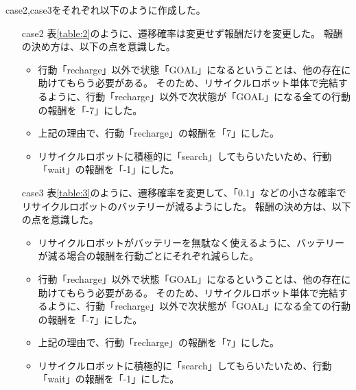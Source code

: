 case2,case3をそれぞれ以下のように作成した。
\begin{itemize}
  \item[case2] 表\ref{table:2}のように、遷移確率は変更せず報酬だけを変更した。
  報酬の決め方は、以下の点を意識した。
  \begin{itemize}
    \item 行動「recharge」以外で状態「GOAL」になるということは、他の存在に助けてもらう必要がある。
    そのため、リサイクルロボット単体で完結するように、行動「recharge」以外で次状態が「GOAL」になる全ての行動の報酬を「-7」にした。
    \item 上記の理由で、行動「recharge」の報酬を「7」にした。
    \item リサイクルロボットに積極的に「search」してもらいたいため、行動「wait」の報酬を「-1」にした。
  \end{itemize}
  \item[case3] 表\ref{table:3}のように、遷移確率を変更して、「0.1」などの小さな確率でリサイクルロボットのバッテリーが減るようにした。
  報酬の決め方は、以下の点を意識した。
  \begin{itemize}
    \item リサイクルロボットがバッテリーを無駄なく使えるように、バッテリーが減る場合の報酬を行動ごとにそれぞれ減らした。
    \item 行動「recharge」以外で状態「GOAL」になるということは、他の存在に助けてもらう必要がある。
    そのため、リサイクルロボット単体で完結するように、行動「recharge」以外で次状態が「GOAL」になる全ての行動の報酬を「-7」にした。
    \item 上記の理由で、行動「recharge」の報酬を「7」にした。
    \item リサイクルロボットに積極的に「search」してもらいたいため、行動「wait」の報酬を「-1」にした。
  \end{itemize}
\end{itemize}

